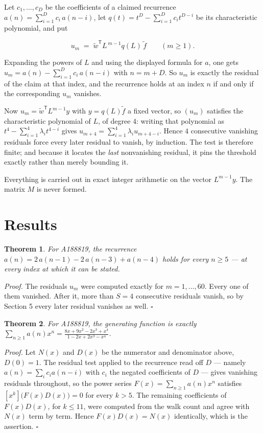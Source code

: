 \documentclass[11pt]{article}
\newtheorem{theorem}{Theorem}
\theoremstyle{definition}
\begin{document}
Let $c_1,\dots,c_D$ be the coefficients of a claimed recurrence $a(n) = \sum_{i=1}^{D} c_i\,a(n-i)$, let $q(t) = t^{D} - \sum_{i=1}^{D} c_i t^{D-i}$ be its characteristic polynomial, and put

\[u_m \;=\; \tilde w^{\mathsf T} L^{\,m-1} q(L)\,\tilde f \qquad (m \ge 1).\]

Expanding the powers of $L$ and using the displayed formula for $a$, one gets $u_m = a(n) - \sum_{i=1}^{D} c_i\,a(n-i)$ with $n = m + D$. So $u_m$ is exactly the residual of the claim at that index, and the recurrence holds at an index $n$ if and only if the corresponding $u_m$ vanishes.

Now $u_m = \tilde w^{\mathsf T} L^{m-1} y$ with $y = q(L)\tilde f$ a fixed vector, so $(u_m)$ satisfies the characteristic polynomial of $L$, of degree $4$: writing that polynomial as $t^{4} - \sum_{i=1}^{4} \lambda_i t^{4-i}$ gives $u_{m+4} = \sum_{i=1}^{4} \lambda_i u_{m+4-i}$. Hence $4$ consecutive vanishing residuals force every later residual to vanish, by induction. The test is therefore finite; and because it locates the {\itshape last} nonvanishing residual, it pins the threshold exactly rather than merely bounding it.

Everything is carried out in exact integer arithmetic on the vector $L^{m-1}y$. The matrix $M$ is never formed.

\section{Results}

\begin{theorem} For A188819, the recurrence $a(n) = 2\,a(n-1) - 2\,a(n-3) + a(n-4)$ holds for every $n \ge 5$ --- at every index at which it can be stated.\end{theorem}

{\itshape Proof.} The residuals $u_m$ were computed exactly for $m = 1,\dots,60$. Every one of them vanished. After it, more than $S = 4$ consecutive residuals vanish, so by Section 5 every later residual vanishes as well. $\square$

\begin{theorem} For A188819, the generating function is exactly $\sum_{n\ge 1} a(n)x^n = \frac{8x + 9x^{2} - 2x^{3} + x^{4}}{1 - 2x + 2x^{3} - x^{4}}$.\end{theorem}

{\itshape Proof.} Let $N(x)$ and $D(x)$ be the numerator and denominator above, $D(0)=1$. The residual test applied to the recurrence read off $D$ --- namely $a(n) = \sum_i c_i a(n-i)$ with $c_i$ the negated coefficients of $D$ --- gives vanishing residuals throughout, so the power series $F(x)=\sum_{n\ge 1}a(n)x^n$ satisfies $[x^k]\bigl(F(x)D(x)\bigr) = 0$ for every $k > 5$. The remaining coefficients of $F(x)D(x)$, for $k \le 11$, were computed from the walk count and agree with $N(x)$ term by term. Hence $F(x)D(x) = N(x)$ identically, which is the assertion. $\square$
\end{document}

